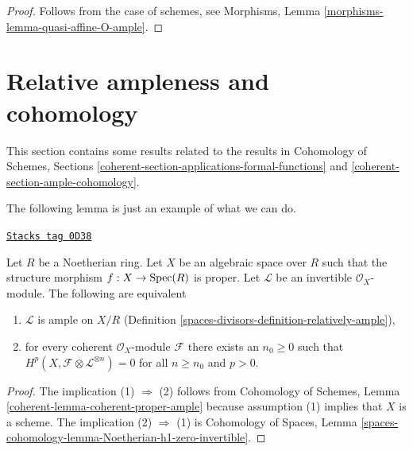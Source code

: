 \begin{proof}
Follows from the case of schemes, see
Morphisms, Lemma \ref{morphisms-lemma-quasi-affine-O-ample}.
\end{proof}

\section{Relative ampleness and cohomology}
\label{spaces-divisors-section-ample-and-proper}
This section contains some results related to the results
in Cohomology of Schemes, Sections
\ref{coherent-section-applications-formal-functions} and
\ref{coherent-section-ample-cohomology}.

\medskip\noindent
The following lemma is just an example of what we can do.

\begin{lemma}
\label{spaces-divisors-lemma-vanshing-gives-ample}
\href{https://stacks.math.columbia.edu/tag/0D38}{\texttt{Stacks tag 0D38}}

Let $R$ be a Noetherian ring. Let $X$ be an algebraic space over $R$
such that the structure morphism $f : X \to \operatorname{Spec}(R)$ is proper.
Let $\mathcal{L}$ be an invertible $\mathcal{O}_X$-module.
The following are equivalent
\begin{enumerate}
\item $\mathcal{L}$ is ample on $X/R$
(Definition \ref{spaces-divisors-definition-relatively-ample}),
\item for every coherent $\mathcal{O}_X$-module $\mathcal{F}$
there exists an $n_0 \geq 0$ such that
$H^p(X, \mathcal{F} \otimes \mathcal{L}^{\otimes n}) = 0$
for all $n \geq n_0$ and $p > 0$.
\end{enumerate}
\end{lemma}

\begin{proof}
The implication (1) $\Rightarrow$ (2) follows from
Cohomology of Schemes, Lemma \ref{coherent-lemma-coherent-proper-ample}
because assumption (1) implies that $X$ is a scheme.
The implication (2) $\Rightarrow$ (1) is
Cohomology of Spaces, Lemma
\ref{spaces-cohomology-lemma-Noetherian-h1-zero-invertible}.
\end{proof}

